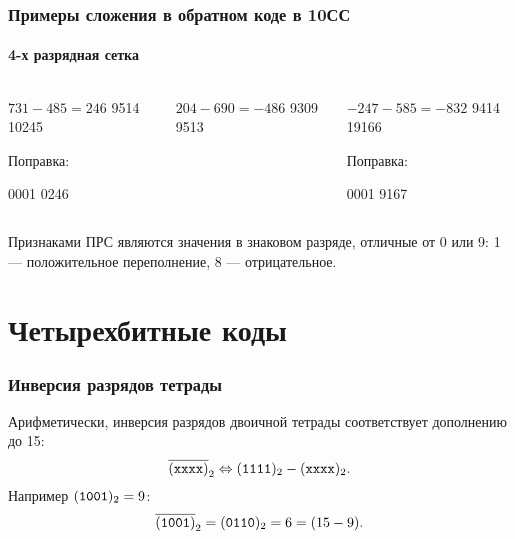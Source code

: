 \begin{frame}
    \frametitle{Примеры сложения в обратном коде в 10СС}
    \framesubtitle{4-х разрядная сетка}
    
    \begin{columns}
            \begin{block}{$731-485=246$}
                 \center
                          {9514}
                         {10245}
                         
                 Поправка:                         
                 
                          {0001}
                          {0246}
            \end{block}
            \begin{block}{$204-690=-486$}
                 \center
                          {9309}
                          {9513}
            \end{block}
            \begin{block}{$-247-585=-832$}
                 \center
                          {9414}
                         {19166}
                         
                 Поправка:                         
                 
                          {0001}
                          {9167}
            \end{block}
    \end{columns}

    Признаками ПРС являются значения в знаковом разряде, отличные от 0 или 9: 1 --- положительное переполнение, 8 --- отрицательное.
\end{frame}


\section{Четырехбитные коды}


\begin{frame}
    \frametitle{Инверсия разрядов тетрады}

    Арифметически, инверсия разрядов двоичной тетрады соответствует дополнению до 15:
    \[
        \overline{(\texttt{xxxx})}_2 \Leftrightarrow (\texttt{1111})_2-(\texttt{xxxx})_2.
    \]
    Например $(\texttt{1001})_2=9$:
    \[
        \overline{(\texttt{1001})}_2=(\texttt{0110})_2=6=(15-9).
    \]
\end{frame}


